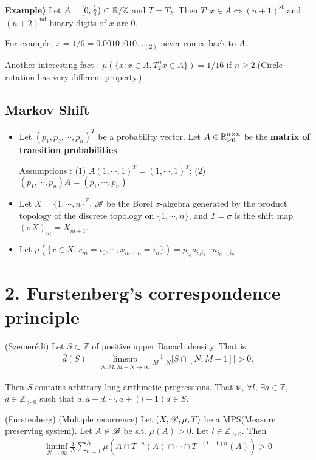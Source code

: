 \documentclass[10pt,a4paper]{report}
\begin{document}
\textbf{Example)} Let $A = [0,\frac{1}{4}) \subset \mathbb{R}/\mathbb{Z}$ and $T = T_2$. Then $T^n x \in A \Leftrightarrow (n+1)^{\text{st}}$ and $(n+2)^{\text{nd}}$ binary digits of $x$ are 0.

For example, $x = 1/6 = 0.00101010\ldots_{(2)}$ never comes back to $A$.

Another interesting fact : $\mu(\{x : x\in A, T_2^n x \in A \}) = 1/16$ if $n\geq2$.(Circle rotation has very different property.)
\s

\subsection*{Markov Shift}

\begin{itemize}
\item Let $(p_1, p_2, \cdots, p_n)^T$ be a probability vector. Let $A \in \mathbb{R}_{\geq 0}^{n\times n}$ be the \textbf{matrix of transition probabilities}.

Assumptions : (1) $A(1,\cdots,1)^T = (1,\cdots,1)^T$; (2) $(p_1, \cdots, p_n) A = (p_1, \cdots, p_n)$

\item Let $X = \{ 1,\cdots,n\}^{\mathbb{Z}}$, $\mathscr{B}$ be the Borel $\sigma$-algebra generated by the product topology of the discrete topology on $\{1,\cdots, n\}$, and $T = \sigma$ is the shift map $(\sigma X)_m = X_{m+1}$.

\item Let $\mu(\{x\in X : x_m=i_0,\cdots,x_{m+n}=i_n\}) = p_{i_0} a_{i_0 i_1} \cdots a_{i_{n-1} i_n}$.
\end{itemize}
\s

\section*{2. Furstenberg's correspondence principle}

\thm (Szemer\'{e}di) Let $S \subset \mathbb{Z}$ of positive upper Banach density. That is:
\begin{align*}
\bar{d}(S) = \limsup_{N,M : M-N \rightarrow \infty} \frac{1}{M-N}|S \cap [N,M-1] | >0.
\end{align*}

Then $S$ contains arbitrary long arithmetic progressions. That is, $\forall l$, $\exists a \in \mathbb{Z}$, $d\in \mathbb{Z}_{>0}$ such that $a, a+d, \cdots, a+(l-1)d \in S$.
\s

\thm (Furstenberg) (Multiple recurrence) Let $(X,\mathscr{B},\mu, T)$ be a MPS(Measure preserving system). Let $A \in \mathscr{B}$ be s.t. $\mu(A) >0$. Let $l\in \mathbb{Z}_{>0}$. Then
\begin{align*}
\liminf_{N\rightarrow \infty} \frac{1}{N} \sum_{n=1}^N \mu(A\cap T^{-n}(A) \cap \cdots \cap T^{-(l-1)n}(A))>0
\end{align*}
\s
\end{document}

